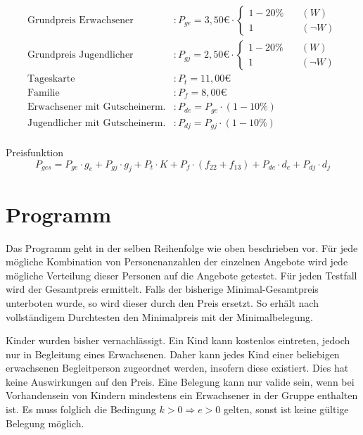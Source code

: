 \documentclass[a4paper, 12pt]{scrartcl}
\begin{document}
\begin{align*}
	\text{Grundpreis Erwachsener}&: P_{ge} = 3,50\euro \cdot \begin{cases} 1 - 20\% \quad&(W) \\ 1 \quad&(\neg W) \end{cases} \\
	\text{Grundpreis Jugendlicher}&: P_{gj} = 2,50\euro \cdot \begin{cases} 1 - 20\% \quad&(W) \\ 1 \quad&(\neg W) \end{cases} \\
	\text{Tageskarte}&: P_t = 11,00\euro \\
	\text{Familie}&: P_f = 8,00\euro \\
	\text{Erwachsener mit Gutscheinerm.}&: P_{de} = P_{ge} \cdot (1 - 10\%) \\
	\text{Jugendlicher mit Gutscheinerm.}&: P_{dj} = P_{gj} \cdot (1 - 10\%) \\
\end{align*}

\begin{framed}
\textsf{Preisfunktion}
\[
	P_{ges} = P_{ge} \cdot g_e + P_{gj} \cdot g_j + P_t \cdot K + P_f \cdot (f_{22} + f_{13}) + P_{de} \cdot d_e + P_{dj} \cdot d_j
\]
\end{framed}
\section*{Programm}
Das Programm geht in der selben Reihenfolge wie oben beschrieben vor. Für jede mögliche Kombination von Personenanzahlen der einzelnen Angebote wird jede mögliche Verteilung dieser Personen auf die Angebote getestet. Für jeden Testfall wird der Gesamtpreis ermittelt. Falls der bisherige Minimal-Gesamtpreis unterboten wurde, so wird dieser durch den Preis ersetzt. So erhält nach vollständigem Durchtesten den Minimalpreis mit der Minimalbelegung.

Kinder wurden bisher vernachlässigt. Ein Kind kann kostenlos eintreten, jedoch nur in Begleitung eines Erwachsenen. Daher kann jedes Kind einer beliebigen erwachsenen Begleitperson zugeordnet werden, insofern diese existiert. Dies hat keine Auswirkungen auf den Preis. Eine Belegung kann nur valide sein, wenn bei Vorhandensein von Kindern mindestens ein Erwachsener in der Gruppe enthalten ist. Es muss folglich die Bedingung $k > 0 \Rightarrow e > 0$ gelten, sonst ist keine gültige Belegung möglich.
\end{document}
